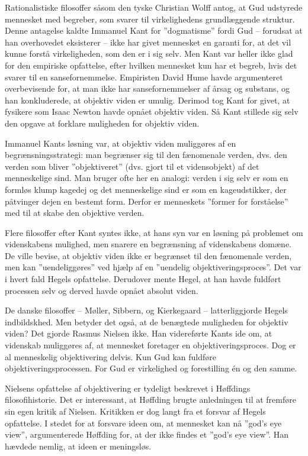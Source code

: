 \documentclass[12pt]{article}
\begin{document}
Rationalistiske filosoffer såsom den tyske Christian Wolff antog, at Gud
udstyrede mennesket med begreber, som svarer til virkelighedens
grundlæggende struktur. Denne antagelse kaldte Immanuel Kant for
''dogmatisme'' fordi Gud -- forudsat at han overhovedet eksisterer --
ikke har givet mennesket en garanti for, at det vil kunne forstå
virkeligheden, som den er i sig selv. Men Kant var heller ikke glad for
den empiriske opfattelse, efter hvilken mennesket kun har et begreb,
hvis det svarer til en sansefornemmelse. Empiristen David Hume havde
argumenteret overbevisende for, at man ikke har sansefornemmelser af
årsag og substans, og han konkluderede, at objektiv viden er umulig.
Derimod tog Kant for givet, at fysikere som Isaac Newton havde opnået
objektiv viden. Så Kant stillede sig selv den opgave at forklare
muligheden for objektiv viden.

Immanuel Kants løsning var, at objektiv viden muliggøres af en
begrænsningsstrategi: man begrænser sig til den fænomenale verden, dvs.
den verden som bliver ''objektiveret'' (dvs. gjort til et vidensobjekt)
af det menneskelige sind. Man bruger ofte her en analogi: verden i sig
selv er som en formløs klump kagedej og det menneskelige sind er som en
kageudstikker, der påtvinger dejen en bestemt form. Derfor er menneskets
''former for forståelse'' med til at skabe den objektive verden.

Flere filosoffer efter Kant syntes ikke, at hans syn var en løsning på
problemet om videnskabens mulighed, men snarere en begrænsning af
videnskabens domæne. De ville bevise, at objektiv viden ikke er
begrænset til den fænomenale verden, men kan ''uendeliggøres'' ved hjælp
af en ''uendelig objektiveringsproces''. Det var i hvert fald Hegels
opfattelse. Derudover mente Hegel, at han havde fuldført processen selv
og derved havde opnået absolut viden.

De danske filosoffer -- Møller, Sibbern, og Kierkegaard --
latterliggjorde Hegels indbildskhed. Men betyder det også, at de
benægtede muligheden for objektiv viden? Det gjorde Rasmus Nielsen ikke.
Han videreførte Kants ide om, at videnskab muliggøres af, at mennesket
foretager en objektiveringsproces. Dog er al menneskelig objektivering
delvis. Kun Gud kan fuldføre objektiveringsprocessen. For Gud er
virkelighed og forestilling én og den samme.

Nielsens opfattelse af objektivering er tydeligt beskrevet i Høffdings
filosofihistorie. Det er interessant, at Høffding brugte anledningen til
at fremføre sin egen kritik af Nielsen. Kritikken er dog langt fra et
forsvar af Hegels opfattelse. I stedet for at forsvare ideen om, at
mennesket kan nå ''god's eye view'', argumenterede Høffding for, at der
ikke findes et ''god's eye view''. Han hævdede nemlig, at ideen er
meningsløs.
\end{document}
